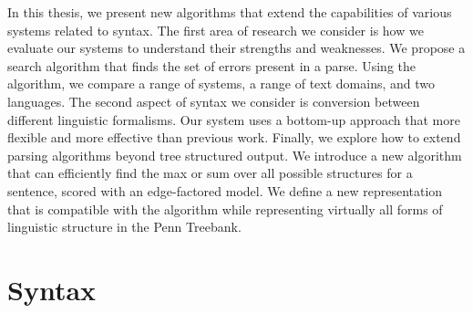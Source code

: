 In this thesis, we present new algorithms that extend the capabilities of various systems related to syntax.
The first area of research we consider is how we evaluate our systems to understand their strengths and weaknesses.
We propose a search algorithm that finds the set of errors present in a parse.
Using the algorithm, we compare a range of systems, a range of text domains, and two languages.
The second aspect of syntax we consider is conversion between different linguistic formalisms.
Our system uses a bottom-up approach that more flexible and more effective than previous work.
Finally, we explore how to extend parsing algorithms beyond tree structured output.
We introduce a new algorithm that can efficiently find the max or sum over all possible structures for a sentence, scored with an edge-factored model.
We define a new representation that is compatible with the algorithm while representing virtually all forms of linguistic structure in the Penn Treebank.

\section{Syntax}
\label{sec:syntax}

